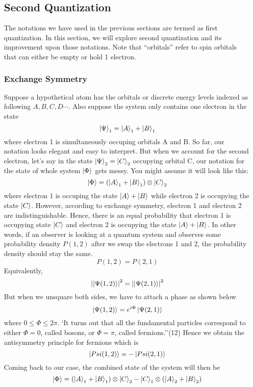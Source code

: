 \documentclass{article}
\begin{document}
  \subsection{Second Quantization}
  The notations we have used in the previous sections are termed as first
  quantization. In this section, we will explore second quantization and
  its improvement upon those notations. Note that ``orbitals'' refer to
  spin orbitals that can either be empty or hold 1 electron.
    \subsubsection{Exchange Symmetry}
    Suppose a hypothetical atom has the orbitals or discrete energy levels indexed
    as following \({A, B, C , D\cdots}\). Also suppose the system
    only contains one electron in the state
    \[\ket{\Psi}_1 = \ket{A}_1 + \ket{B}_1\]
    where electron 1 is simultaneously occuping orbitals A and B. So far, our
    notation looks elegant and easy to interpret. But when we account for the
    second electron, let's say in the state \(\ket{\Psi}_2 = \ket{C}_2 \) occupying
    orbital C, our notation for the state of whole system \(\ket{\Phi}\) gets
    messy. You might assume it will look like this:
    \[\ket{\Phi} = (\ket{A}_1 + \ket{B}_1)\otimes\ket{C}_2\]
    where electron 1 is occuping the state \(\ket{A} + \ket{B}\) while
    electron 2 is occupying the state \(\ket{C}\). However, according to
    exchange symmetry, electron 1 and electron 2 are indistinguishable.
    Hence, there is an equal probability that electron 1 is occupying
    state \(\ket{C}\) and electron 2 is occupying the state
    \(\ket{A} + \ket{B}\). In other words, if an observer is looking at a quantum system and observes some
    probability density \(P(1,2)\) after we swap the electrons 1 and 2, the probability
    density should stay the same.
    \[P(1,2) = P(2,1)\]
    Equivalently,
    \[\abs{\ket{\Psi(1,2)}}^2 = \abs{\ket{\Psi(2,1)}}^2\]
    But when we unsquare both sides, we have to attach a phase as shown below
    \[\ket{\Psi(1,2)} =e^{i\Phi}\ket{\Psi(2,1)}\]
    where \(0\leq\Phi\leq2\pi\). `It turns out that all the fundamental particles
    correspond to either \(\Phi=0\), called bosons, or \(\Phi=\pi\),
    called fermions.''(12) Hence we obtain the antisymmetry principle for fermions
    which is
    \[\ket{Psi(1,2)} = -\ket{Psi(2,1)}\]
    Coming back to our case, the combined state of the system will then be
    \[\ket{\Phi} = (\ket{A}_1 + \ket{B}_1)\otimes\ket{C}_2 -
    \ket{C}_1\otimes(\ket{A}_2 + \ket{B}_2)\]
\end{document}
